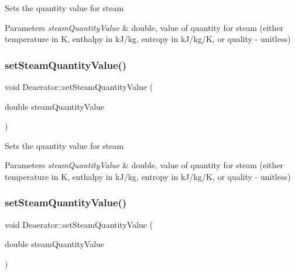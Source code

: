 Sets the quantity value for steam 
\begin{DoxyParams}{Parameters}
{\em steam\+Quantity\+Value} & double, value of quantity for steam (either temperature in K, enthalpy in k\+J/kg, entropy in k\+J/kg/K, or quality -\/ unitless) \\
\hline
\end{DoxyParams}
\mbox{\label{class_deaerator_a101399a8b66c3ff1fecf884fd1b1373d}} 
\subsubsection{\texorpdfstring{set\+Steam\+Quantity\+Value()}{setSteamQuantityValue()}\hspace{0.1cm}{\footnotesize\ttfamily [2/3]}}
{\footnotesize\ttfamily void Deaerator\+::set\+Steam\+Quantity\+Value (\begin{DoxyParamCaption}\item[{double}]{steam\+Quantity\+Value }\end{DoxyParamCaption})}

Sets the quantity value for steam 
\begin{DoxyParams}{Parameters}
{\em steam\+Quantity\+Value} & double, value of quantity for steam (either temperature in K, enthalpy in k\+J/kg, entropy in k\+J/kg/K, or quality -\/ unitless) \\
\hline
\end{DoxyParams}
\mbox{\label{class_deaerator_a101399a8b66c3ff1fecf884fd1b1373d}} 
\subsubsection{\texorpdfstring{set\+Steam\+Quantity\+Value()}{setSteamQuantityValue()}\hspace{0.1cm}{\footnotesize\ttfamily [3/3]}}
{\footnotesize\ttfamily void Deaerator\+::set\+Steam\+Quantity\+Value (\begin{DoxyParamCaption}\item[{double}]{steam\+Quantity\+Value }\end{DoxyParamCaption})}

